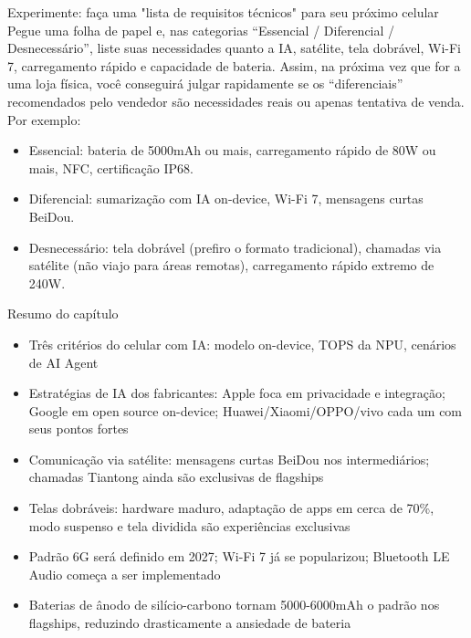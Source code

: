 \begin{tcbpractice}{Experimente: faça uma "lista de requisitos técnicos" para seu próximo celular}
Pegue uma folha de papel e, nas categorias “Essencial / Diferencial / Desnecessário”, liste suas necessidades quanto a IA, satélite, tela dobrável, Wi-Fi 7, carregamento rápido e capacidade de bateria. Assim, na próxima vez que for a uma loja física, você conseguirá julgar rapidamente se os “diferenciais” recomendados pelo vendedor são necessidades reais ou apenas tentativa de venda. Por exemplo:

\begin{itemize}
  \item Essencial: bateria de 5000mAh ou mais, carregamento rápido de 80W ou mais, NFC, certificação IP68.
  \item Diferencial: sumarização com IA on-device, Wi-Fi 7, mensagens curtas BeiDou.
  \item Desnecessário: tela dobrável (prefiro o formato tradicional), chamadas via satélite (não viajo para áreas remotas), carregamento rápido extremo de 240W.
\end{itemize}

\end{tcbpractice}

\begin{tcbsummary}{Resumo do capítulo}
\begin{itemize}
  \item Três critérios do celular com IA: modelo on-device, TOPS da NPU, cenários de AI Agent
  \item Estratégias de IA dos fabricantes: Apple foca em privacidade e integração; Google em open source on-device; Huawei/Xiaomi/OPPO/vivo cada um com seus pontos fortes
  \item Comunicação via satélite: mensagens curtas BeiDou nos intermediários; chamadas Tiantong ainda são exclusivas de flagships
  \item Telas dobráveis: hardware maduro, adaptação de apps em cerca de 70\%, modo suspenso e tela dividida são experiências exclusivas
  \item Padrão 6G será definido em 2027; Wi-Fi 7 já se popularizou; Bluetooth LE Audio começa a ser implementado
  \item Baterias de ânodo de silício-carbono tornam 5000-6000mAh o padrão nos flagships, reduzindo drasticamente a ansiedade de bateria
\end{itemize}

\end{tcbsummary}
